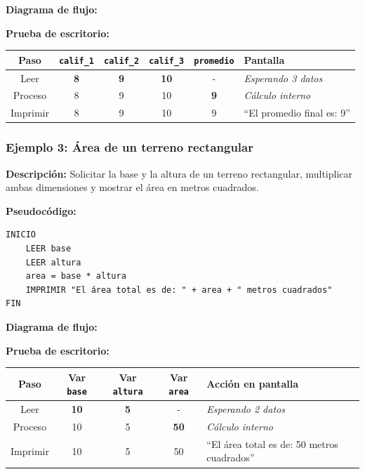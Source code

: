 \textbf{Diagrama de flujo:}



\textbf{Prueba de escritorio:}

{\def\LTcaptype{none} %
\begin{longtable}[]{@{}cccccl@{}}
\toprule\noalign{}
Paso & \texttt{calif\_1} & \texttt{calif\_2} & \texttt{calif\_3} &
\texttt{promedio} & Pantalla \\
\midrule\noalign{}
\endhead
\bottomrule\noalign{}
\endlastfoot
Leer & \textbf{8} & \textbf{9} & \textbf{10} & - & \emph{Esperando 3
datos} \\
Proceso & 8 & 9 & 10 & \textbf{9} & \emph{Cálculo interno} \\
Imprimir & 8 & 9 & 10 & 9 & ``El promedio final es: 9'' \\
\end{longtable}
}

\subsubsection{Ejemplo 3: Área de un terreno
rectangular}\label{ejemplo-3-uxe1rea-de-un-terreno-rectangular}

\textbf{Descripción:} Solicitar la base y la altura de un terreno
rectangular, multiplicar ambas dimensiones y mostrar el área en metros
cuadrados.

\textbf{Pseudocódigo:}

\begin{verbatim}
INICIO
    LEER base
    LEER altura
    area = base * altura
    IMPRIMIR "El área total es de: " + area + " metros cuadrados"
FIN
\end{verbatim}

\textbf{Diagrama de flujo:}



\textbf{Prueba de escritorio:}

{\def\LTcaptype{none} %
\begin{longtable}[]{@{}ccccl@{}}
\toprule\noalign{}
Paso & Var \texttt{base} & Var \texttt{altura} & Var \texttt{area} &
Acción en pantalla \\
\midrule\noalign{}
\endhead
\bottomrule\noalign{}
\endlastfoot
Leer & \textbf{10} & \textbf{5} & - & \emph{Esperando 2 datos} \\
Proceso & 10 & 5 & \textbf{50} & \emph{Cálculo interno} \\
Imprimir & 10 & 5 & 50 & ``El área total es de: 50 metros cuadrados'' \\
\end{longtable}
}

